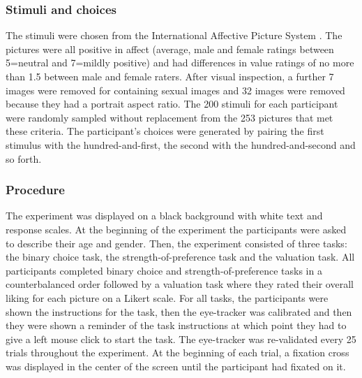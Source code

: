 \documentclass[doc, a4paper, apacite]{apa6}
\begin{document}
\subsubsection{Stimuli and choices}
The stimuli were chosen from the International Affective Picture System \cite{Lang:2008}. The pictures were all positive in affect (average, male and female ratings between 5=neutral and 7=mildly positive) and had differences in value ratings of no more than 1.5 between male and female raters. After visual inspection, a further 7 images were removed for containing sexual images and 32 images were removed because they had a portrait aspect ratio. The 200 stimuli for each participant were randomly sampled without replacement from the 253 pictures that met these criteria. The participant's choices were generated by pairing the first stimulus with the hundred-and-first, the second with the hundred-and-second and so forth. 

\subsubsection{Procedure}
The experiment was displayed on a black background with white text and response scales. At the beginning of the experiment the participants were asked to describe their age and gender. Then, the experiment consisted of three tasks: the binary choice task, the strength-of-preference task and the valuation task. All participants completed binary choice and strength-of-preference tasks in a counterbalanced order followed by a valuation task where they rated their overall liking for each picture on a Likert scale. For all tasks, the participants were shown the instructions for the task, then the eye-tracker was calibrated and then they were shown a reminder of the task instructions at which point they had to give a left mouse click to start the task. The eye-tracker was re-validated every 25 trials throughout the experiment. At the beginning of each trial, a fixation cross was displayed in the center of the screen until the participant had fixated on it. 
\end{document}
